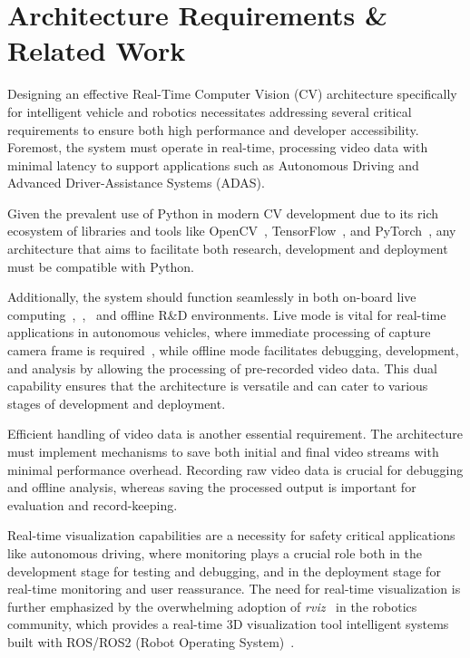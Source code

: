 \documentclass[conference]{IEEEtran}
\begin{document}
\section{Architecture Requirements \& Related Work}

Designing an effective Real-Time Computer Vision (CV) architecture specifically for intelligent vehicle and robotics necessitates addressing several critical requirements to ensure both high performance and developer accessibility.
Foremost, the system must operate in real-time, processing video data with minimal latency to support applications such as Autonomous Driving and Advanced Driver-Assistance Systems (ADAS).

Given the prevalent use of Python in modern CV development due to its rich ecosystem of libraries and tools like OpenCV~\cite{opencv_library}, TensorFlow~\cite{tensorflow}, and PyTorch~\cite{pytorch}, any architecture that aims to facilitate both research, development and deployment must be compatible with Python.

Additionally, the system should function seamlessly in both on-board live computing~\cite{online1},~\cite{online-offline},~\cite{rthysensorfusion} and offline R\&D environments.
Live mode is vital for real-time applications in autonomous vehicles, where immediate processing of capture camera frame is required~\cite{rtvision}, while offline mode facilitates debugging, development, and analysis by allowing the processing of pre-recorded video data.
This dual capability ensures that the architecture is versatile and can cater to various stages of development and deployment.

Efficient handling of video data is another essential requirement.
The architecture must implement mechanisms to save both initial and final video streams with minimal performance overhead.
Recording raw video data is crucial for debugging and offline analysis, whereas saving the processed output is important for evaluation and record-keeping.

Real-time visualization capabilities are a necessity for safety critical applications like autonomous driving, where monitoring plays a crucial role both in the development stage for testing and debugging, and in the deployment stage for real-time monitoring and user reassurance.
The need for real-time visualization is further emphasized by the overwhelming adoption of \textit{rviz}~\cite{kam2015rviz} in the robotics community, which provides a real-time 3D visualization tool intelligent systems built with ROS/ROS2 (Robot Operating System)~\cite{ros2}.
\end{document}
